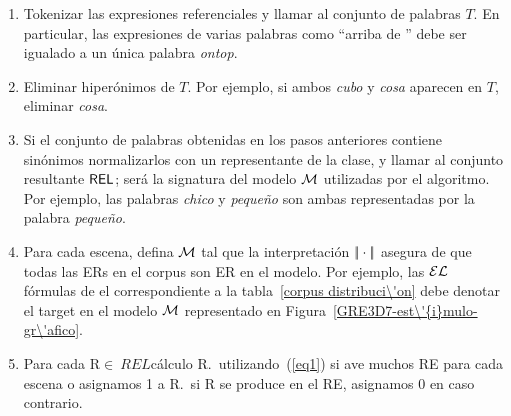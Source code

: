 \begin{enumerate}





\item Tokenizar las expresiones referenciales y llamar al conjunto de palabras
 $T$. En particular, las expresiones de varias palabras como ``arriba de ''
  debe ser igualado a un \'unica palabra \emph{ontop}.

\item Eliminar hiper\'onimos de $T$. Por ejemplo, si ambos \emph{cubo} y
  \emph{cosa} aparecen en $T$, eliminar \emph{cosa}.

\item Si el conjunto de palabras obtenidas en los pasos anteriores contiene
  sin\'onimos normalizarlos con un representante de la clase,
  y llamar al conjunto resultante $\textsf{REL}$; ser\'a la signatura del
  modelo $\mathcal{M}$ utilizadas por el algoritmo. Por ejemplo, las palabras \emph{chico}
  y \emph{peque\~no} son ambas representadas por la palabra \emph{peque\~no}.

\item Para cada escena, defina $\mathcal{M}$ tal que la interpretaci\'on
 $|\!|\cdot|\!|$ asegura de que todas las ERs en el corpus son ER en
  el modelo. Por ejemplo, las $\mathcal{EL}$ f\'ormulas de el correspondiente a la tabla~\ref{corpus distribuci\'on} debe denotar el target en el
  modelo $\mathcal{M}$ representado en
  Figura~\ref{GRE3D7-est\'{i}mulo-gr\'afico}.

\item Para cada R$\in \ REL$c\'alculo R.\puse \ utilizando~(\ref{eq1}) si
  ave muchos RE para cada escena o asignamos 1 a R.\puse \ si R se produce en
  el RE, asignamos 0 en caso contrario.


\end{enumerate}

